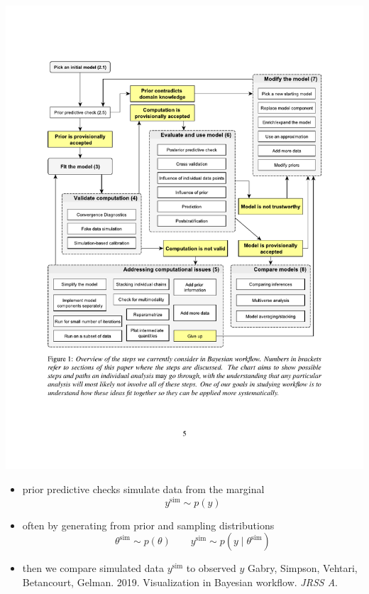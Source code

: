 \documentclass[10pt]{report}
\newcommand{\simvar}[1]{#1^{\textrm{sim}}}
\begin{document}
\begin{center}
\vspace*{-6pt}
\includegraphics[height=0.9\textheight]{img/workflow-fig.pdf}
\end{center}

\begin{itemize}
\item prior predictive checks simulate data from the marginal
  \[
    \simvar{y} \sim p(y)
  \]
\item often by generating from prior and sampling distributions
  \[
    \simvar{\theta} \sim p(\theta)
    \qquad
    \simvar{y} \sim p(y \mid \simvar{\theta})
  \]
\item then we compare simulated data $\simvar{y}$ to observed $y$
  \vfill
  {\tiny Gabry, Simpson, Vehtari, Betancourt,
    Gelman. 2019. Visualization in Bayesian workflow. \textit{JRSS A}.}
\end{itemize}

\end{document}
